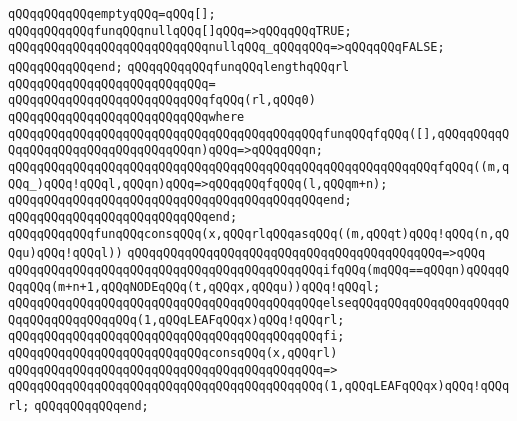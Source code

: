 \verb|qQQqqQQqqQQqemptyqQQq=qQQq[];|\newline
\newline
\verb|qQQqqQQqqQQqfunqQQqnullqQQq[]qQQq=>qQQqqQQqTRUE;|\newline
\verb|qQQqqQQqqQQqqQQqqQQqqQQqqQQqnullqQQq_qQQqqQQq=>qQQqqQQqFALSE;|\newline
\verb|qQQqqQQqqQQqend;|\newline
\newline
\verb|qQQqqQQqqQQqfunqQQqlengthqQQqrl|\newline
\verb|qQQqqQQqqQQqqQQqqQQqqQQqqQQq=|\newline
\verb|qQQqqQQqqQQqqQQqqQQqqQQqqQQqfqQQq(rl,qQQq0)|\newline
\verb|qQQqqQQqqQQqqQQqqQQqqQQqqQQqwhere|\newline
\verb|qQQqqQQqqQQqqQQqqQQqqQQqqQQqqQQqqQQqqQQqqQQqfunqQQqfqQQq([],qQQqqQQqqQQqqQQqqQQqqQQqqQQqqQQqqQQqn)qQQq=>qQQqqQQqn;|\newline
\verb|qQQqqQQqqQQqqQQqqQQqqQQqqQQqqQQqqQQqqQQqqQQqqQQqqQQqqQQqqQQqfqQQq((m,qQQq_)qQQq!qQQql,qQQqn)qQQq=>qQQqqQQqfqQQq(l,qQQqm+n);|\newline
\verb|qQQqqQQqqQQqqQQqqQQqqQQqqQQqqQQqqQQqqQQqqQQqend;|\newline
\verb|qQQqqQQqqQQqqQQqqQQqqQQqqQQqend;|\newline
\newline
\verb|qQQqqQQqqQQqfunqQQqconsqQQq(x,qQQqrlqQQqasqQQq((m,qQQqt)qQQq!qQQq(n,qQQqu)qQQq!qQQql))|\newline
\verb|qQQqqQQqqQQqqQQqqQQqqQQqqQQqqQQqqQQqqQQqqQQq=>qQQq|\newline
\verb|qQQqqQQqqQQqqQQqqQQqqQQqqQQqqQQqqQQqqQQqqQQqifqQQq(mqQQq==qQQqn)qQQqqQQqqQQq(m+n+1,qQQqNODEqQQq(t,qQQqx,qQQqu))qQQq!qQQql;|\newline
\verb|qQQqqQQqqQQqqQQqqQQqqQQqqQQqqQQqqQQqqQQqqQQqelseqQQqqQQqqQQqqQQqqQQqqQQqqQQqqQQqqQQqqQQq(1,qQQqLEAFqQQqx)qQQq!qQQqrl;|\newline
\verb|qQQqqQQqqQQqqQQqqQQqqQQqqQQqqQQqqQQqqQQqqQQqfi;|\newline
\newline
\verb|qQQqqQQqqQQqqQQqqQQqqQQqqQQqconsqQQq(x,qQQqrl)|\newline
\verb|qQQqqQQqqQQqqQQqqQQqqQQqqQQqqQQqqQQqqQQqqQQq=>|\newline
\verb|qQQqqQQqqQQqqQQqqQQqqQQqqQQqqQQqqQQqqQQqqQQq(1,qQQqLEAFqQQqx)qQQq!qQQqrl;|\newline
\verb|qQQqqQQqqQQqend;|\newline
\newline
